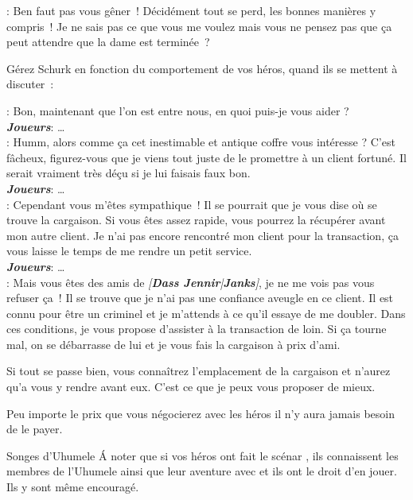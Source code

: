 \begin{quotebox}
    : Ben faut pas vous gêner~! Décidément tout se perd, les bonnes manières y compris~! Je ne sais pas ce que vous me voulez mais vous ne pensez pas que ça peut attendre que la dame est terminée~?
\end{quotebox}

Gérez Schurk en fonction du comportement de vos héros, quand ils se mettent à discuter~:

\begin{quotebox}
    : Bon, maintenant que l’on est entre nous, en quoi puis-je vous aider ?\\
    \textit{\textbf{Joueurs}}: \ldots\\
    : Humm, alors comme ça cet inestimable et antique coffre vous intéresse ? C’est fâcheux, figurez-vous que je viens tout juste de le promettre à un client fortuné. Il serait vraiment très déçu si je lui faisais faux bon.\\
    \textit{\textbf{Joueurs}}: \ldots\\
    : Cependant vous m’êtes sympathique~! Il se pourrait que je vous dise où se trouve la cargaison. Si vous êtes assez rapide, vous pourrez la récupérer avant mon autre client. Je n’ai pas encore rencontré mon client pour la transaction, ça vous laisse le temps de me rendre un petit service.\\
    \textit{\textbf{Joueurs}}: \ldots \\
    : Mais vous êtes des amis de \textit{[\textbf{Dass Jennir}|\textbf{Janks}]}, je ne me vois pas vous refuser ça~! Il se trouve que je n’ai pas une confiance aveugle en ce client. Il est connu pour être un criminel et je m’attends à ce qu’il essaye de me doubler. Dans ces conditions, je vous propose d’assister à la transaction de loin. Si ça tourne mal, on se débarrasse de lui et je vous fais la cargaison à prix d’ami.

    Si tout se passe bien, vous connaîtrez l’emplacement de la cargaison et n’aurez qu’a vous y rendre avant eux. C’est ce que je peux vous proposer de mieux.
\end{quotebox}

Peu importe le prix que vous négocierez avec les héros il n’y aura jamais besoin de le payer.
\begin{paperbox}{Songes d’Uhumele}
    \'A noter que si vos héros ont fait le scénar , ils connaissent les membres de l’Uhumele ainsi que leur aventure avec  et ils ont le droit d’en jouer. Ils y sont même encouragé.
\end{paperbox}
